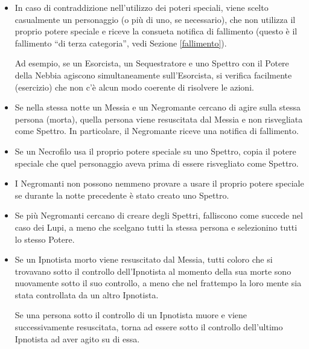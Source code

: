 \documentclass[a4paper,10pt]{article}
\begin{document}
\begin{itemize}
 
 \item In caso di contraddizione nell'utilizzo dei poteri speciali, viene scelto casualmente un personaggio (o più di uno, se necessario), che non utilizza il proprio potere speciale e riceve la consueta notifica di fallimento (questo è il fallimento ``di terza categoria'', vedi Sezione \ref{fallimento}).
 
 Ad esempio, se un Esorcista, un Sequestratore e uno Spettro con il Potere della Nebbia agiscono simultaneamente sull'Esorcista, si verifica facilmente (esercizio) che non c'è alcun modo coerente di risolvere le azioni.
 
 \item Se nella stessa notte un Messia e un Negromante cercano di agire sulla stessa persona (morta), quella persona viene resuscitata dal Messia e non risvegliata come Spettro. In particolare, il Negromante riceve una notifica di fallimento.

 \item Se un Necrofilo usa il proprio potere speciale su uno Spettro, copia il potere speciale che quel personaggio aveva prima di essere risvegliato come Spettro.
 
 \item I Negromanti non possono nemmeno provare a usare il proprio potere speciale se durante la notte precedente è stato creato uno Spettro.
 
 \item Se più Negromanti cercano di creare degli Spettri, falliscono come succede nel caso dei Lupi, a meno che scelgano tutti la stessa persona e selezionino tutti lo stesso Potere.

 \item Se un Ipnotista morto viene resuscitato dal Messia, tutti coloro che si trovavano sotto il controllo dell'Ipnotista al momento della sua morte sono nuovamente sotto il suo controllo, a meno che nel frattempo la loro mente sia stata controllata da un altro Ipnotista.
 
 Se una persona sotto il controllo di un Ipnotista muore e viene successivamente resuscitata, torna ad essere sotto il controllo dell'ultimo Ipnotista ad aver agito su di essa.
 

\end{itemize}
\end{document}
